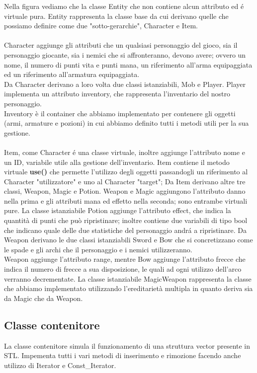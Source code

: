 \documentclass[../relazione.tex]{subfiles}
\begin{document}
Nella figura vediamo che la classe Entity che non contiene alcun attributo ed é virtuale pura.
Entity rappresenta la classe base da cui derivano quelle che possiamo definire come due "sotto-gerarchie", Character e Item.\\ \\
Character aggiunge gli attributi che un qualsiasi personaggio del gioco, sia il personaggio giocante, sia i nemici che si affronteranno, devono avere;
ovvero un nome, il numero di punti vita e punti mana, un riferimento all'arma equipaggiata ed un riferimento all'armatura equipaggiata.\\
Da Character derivano a loro volta due classi istanziabili, Mob e Player. Player implementa un attributo inventory, che rappresenta l'inventario del nostro personaggio.\\
Inventory è il container che abbiamo implementato per contenere gli oggetti (armi, armature e pozioni) in cui abbiamo definito tutti i metodi utili per la sua gestione.\\ \\
\newpage{}
Item, come Character é una classe virtuale, inoltre aggiunge l'attributo nome e un ID, variabile utile alla gestione dell'inventario.
Item contiene il metodo virtuale \textbf{use()} che permette l'utilizzo degli oggetti passandogli un riferimento al Character "utilizzatore" e uno al Character "target"; 
Da Item derivano altre tre classi, Weapon, Magic e Potion.
Weapon e Magic aggiungono l'attributo danno nella prima e gli attributi mana ed effetto nella seconda; sono entrambe virtuali pure.
La classe istanziabile Potion aggiunge l'attributo effect, che indica la quantità di punti che può ripristinare; inoltre contiene due variabili di tipo bool che indicano quale
delle due statistiche del personaggio andrá a ripristinare.
Da Weapon derivano le due classi istanziabili Sword e Bow che si concretizzano come le spade e gli archi che il personaggio e i nemici utilizzeranno.\\
Weapon aggiunge l'attributo range, mentre Bow aggiunge l'attributo frecce che indica il numero di frecce a sua disposizione, le quali ad ogni utilizzo dell'arco
verranno decrementate.
La classe istanziabile MagicWeapon rappresenta la classe che abbiamo implementato utilizzando l'ereditarietà multipla in quanto deriva sia da Magic che da Weapon.

\subsection{Classe contenitore}
\label{ssec:classe-contenitore}
La classe contenitore simula il funzionamento di una struttura vector presente in STL. Impementa tutti i vari metodi di inserimento e rimozione facendo anche utilizzo
di Iterator e Const\_Iterator.
\end{document}
